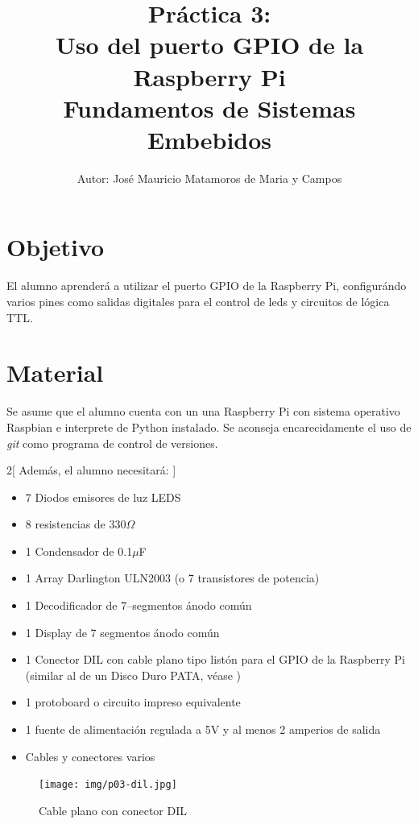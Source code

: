 \documentclass[letterpaper,10.5pt]{article}
\author{\footnotesize Autor: José Mauricio Matamoros de Maria y Campos}
\title{Práctica 3:\\Uso del puerto GPIO de la Raspberry Pi\\
{\large Fundamentos de Sistemas Embebidos}}
\date{}
\begin{document}
\maketitle

\section{Objetivo}%
\label{sec:objective}
El alumno aprenderá a utilizar el puerto GPIO de la Raspberry Pi, configurándo varios pines como salidas digitales para el control de leds y circuitos de lógica TTL.%


\section{Material}%
\label{sec:material}
Se asume que el alumno cuenta con un una Raspberry Pi con sistema operativo Raspbian e interprete de Python instalado. Se aconseja encarecidamente el uso de \textit{git} como programa de control de versiones.

\begin{multicols}{2}[%
Además, el alumno necesitará:
]
\begin{itemize}[noitemsep]
	\item 7 Diodos emisores de luz LEDS
	\item 8 resistencias de 330$\Omega$
	\item 1 Condensador de 0.1$\mu$F
	\item 1 Array Darlington ULN2003 (o 7 transistores de potencia)
	\item 1 Decodificador de 7--segmentos ánodo común
	\item 1 Display de 7 segmentos ánodo común
	\item 1 Conector DIL con cable plano tipo listón para el GPIO de la Raspberry Pi (similar al de un Disco Duro PATA, véase  )
	\item 1 protoboard o circuito impreso equivalente
	\item 1 fuente de alimentación regulada a 5V y al menos 2 amperios de salida
	\item Cables y conectores varios
\end{itemize}
\columnbreak
\begin{figure}[H]
	\centering%
	\texttt{[image: img/p03-dil.jpg]} %
	\caption{Cable plano con conector DIL}
	\label{fig:cable-dil} %
\end{figure}
\end{multicols}
\end{document}
